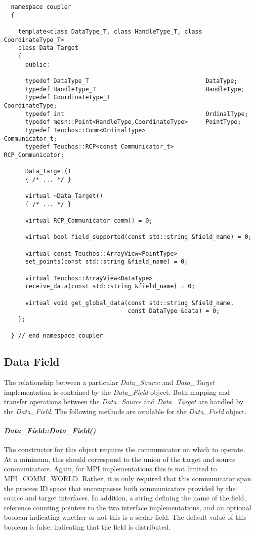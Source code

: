 \documentclass[letterpaper]{article}
\begin{document}
\begin{lstlisting}
  namespace coupler
  {

    template<class DataType_T, class HandleType_T, class CoordinateType_T>
    class Data_Target 
    {
      public:

      typedef DataType_T                                 DataType;
      typedef HandleType_T                               HandleType;
      typedef CoordinateType_T                           CoordinateType;
      typedef int                                        OrdinalType;
      typedef mesh::Point<HandleType,CoordinateType>     PointType;
      typedef Teuchos::Comm<OrdinalType>                 Communicator_t;
      typedef Teuchos::RCP<const Communicator_t>         RCP_Communicator;

      Data_Target()
      { /* ... */ }

      virtual ~Data_Target()
      { /* ... */ }

      virtual RCP_Communicator comm() = 0;

      virtual bool field_supported(const std::string &field_name) = 0;

      virtual const Teuchos::ArrayView<PointType> 
      set_points(const std::string &field_name) = 0;

      virtual Teuchos::ArrayView<DataType> 
      receive_data(const std::string &field_name) = 0;

      virtual void get_global_data(const std::string &field_name,
                                   const DataType &data) = 0;
    };

  } // end namespace coupler
\end{lstlisting}

\subsection{Data Field}

The relationship between a particular {\sl Data\_Source} and {\sl
  Data\_Target} implementation is contained by the {\sl Data\_Field}
object. Both mapping and transfer operations between the {\sl
  Data\_Source} and {\sl Data\_Target} are handled by the {\sl
  Data\_Field}. The following methods are available for the {\sl
  Data\_Field} object.

\paragraph{\sl Data\_Field::Data\_Field()}
The constructor for this object requires the communicator on which to
operate. At a minimum, this should correspond to the union of the
target and source communicators. Again, for MPI implementations this
is not limited to MPI\_COMM\_WORLD. Rather, it is only required that
this communicator span the process ID space that encompasses both
communicators provided by the source and target interfaces. In
addition, a string defining the name of the field, reference counting
pointers to the two interface implementations, and an optional boolean
indicating whether or not this is a scalar field. The default value of
this boolean is false, indicating that the field is distributed.
\end{document}
